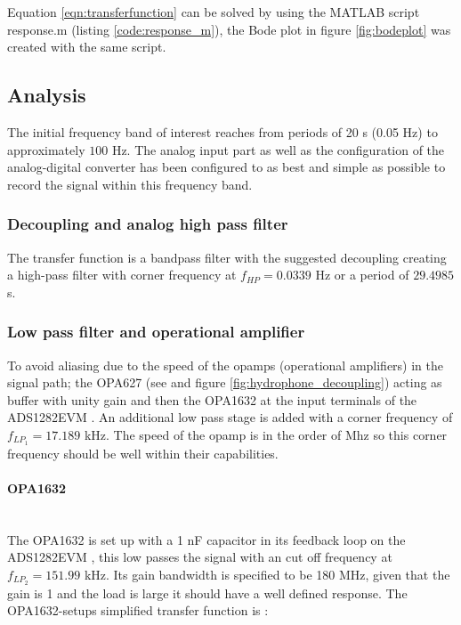 \documentclass[a4paper]{article}
\begin{document}
\begin{multicols}{2}
Equation \ref{eqn:transferfunction} can be solved by using the MATLAB
script response.m (listing \ref{code:response_m}), the Bode plot in figure \ref{fig:bodeplot} was created with the same script.

\subsection{Analysis}
The initial frequency band of interest reaches
from periods of 20 s (0.05 Hz) to approximately $100$ Hz. The analog input part as
well as the configuration of the analog-digital converter has been
configured to as best and simple as possible to record the signal
within this frequency band.

\subsubsection{Decoupling and analog high pass filter}
The transfer function is a bandpass filter with
the suggested decoupling creating a high-pass filter with corner
frequency at $f_{HP} = 0.0339$ Hz or a period of $29.4985$ s.

\subsubsection{Low pass filter and operational amplifier}

To avoid aliasing due to the speed of the opamps (operational
amplifiers) in the signal path; the OPA627 (see \cite{opa627_ds} and
figure \ref{fig:hydrophone_decoupling}) acting as buffer with
unity gain and then the OPA1632 \cite{opa1632_ds} at the input terminals
of the ADS1282EVM \cite{ads1282evm_ds}.
An additional low pass stage is added with a corner frequency of
$f_{LP_1} = 17.189 $ kHz. The speed of the opamp is in the order of Mhz
so this corner frequency should be well within their capabilities.

\paragraph{OPA1632} \ \\
The OPA1632 \cite{opa1632_ds} is set up with a 1 nF capacitor in its
feedback loop on the ADS1282EVM \cite{ads1282evm_ds}, this low passes
the signal with an cut off frequency at $f_{LP_2} = 151.99$ kHz. Its
gain bandwidth is specified to be 180 MHz, given that the gain is 1 and
the load is large it should have a well defined response. The
OPA1632-setups simplified transfer function is \cite{fully_diff_opamps}:


\end{multicols}
\end{document}
